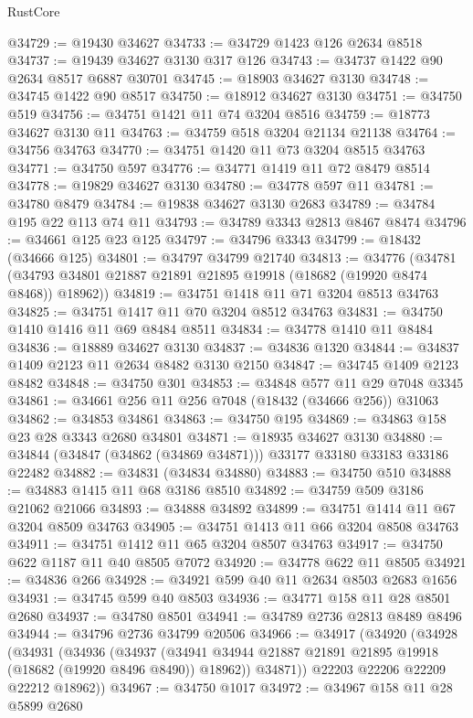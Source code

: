 \begin{lexlean}{RustCore}
\begin{coremodule}
@34729 := @19430 @34627
@34733 := @34729 @1423 @126 @2634 @8518
@34737 := @19439 @34627 @3130 @317 @126
@34743 := @34737 @1422 @90 @2634 @8517 @6887 @30701
@34745 := @18903 @34627 @3130
@34748 := @34745 @1422 @90 @8517
@34750 := @18912 @34627 @3130
@34751 := @34750 @519
@34756 := @34751 @1421 @11 @74 @3204 @8516
@34759 := @18773 @34627 @3130 @11
@34763 := @34759 @518 @3204 @21134 @21138
@34764 := @34756 @34763
@34770 := @34751 @1420 @11 @73 @3204 @8515 @34763
@34771 := @34750 @597
@34776 := @34771 @1419 @11 @72 @8479 @8514
@34778 := @19829 @34627 @3130
@34780 := @34778 @597 @11
@34781 := @34780 @8479
@34784 := @19838 @34627 @3130 @2683
@34789 := @34784 @195 @22 @113 @74 @11
@34793 := @34789 @3343 @2813 @8467 @8474
@34796 := @34661 @125 @23 @125
@34797 := @34796 @3343
@34799 := @18432 (@34666 @125)
@34801 := @34797 @34799 @21740
@34813 := @34776
    (@34781 (@34793 @34801 @21887 @21891 @21895 @19918 (@18682 (@19920 @8474 @8468)) @18962))
@34819 := @34751 @1418 @11 @71 @3204 @8513 @34763
@34825 := @34751 @1417 @11 @70 @3204 @8512 @34763
@34831 := @34750 @1410 @1416 @11 @69 @8484 @8511
@34834 := @34778 @1410 @11 @8484
@34836 := @18889 @34627 @3130
@34837 := @34836 @1320
@34844 := @34837 @1409 @2123 @11 @2634 @8482 @3130 @2150
@34847 := @34745 @1409 @2123 @8482
@34848 := @34750 @301
@34853 := @34848 @577 @11 @29 @7048 @3345
@34861 := @34661 @256 @11 @256 @7048 (@18432 (@34666 @256)) @31063
@34862 := @34853 @34861
@34863 := @34750 @195
@34869 := @34863 @158 @23 @28 @3343 @2680 @34801
@34871 := @18935 @34627 @3130
@34880 := @34844 (@34847 (@34862 (@34869 @34871))) @33177 @33180 @33183 @33186 @22482
@34882 := @34831 (@34834 @34880)
@34883 := @34750 @510
@34888 := @34883 @1415 @11 @68 @3186 @8510
@34892 := @34759 @509 @3186 @21062 @21066
@34893 := @34888 @34892
@34899 := @34751 @1414 @11 @67 @3204 @8509 @34763
@34905 := @34751 @1413 @11 @66 @3204 @8508 @34763
@34911 := @34751 @1412 @11 @65 @3204 @8507 @34763
@34917 := @34750 @622 @1187 @11 @40 @8505 @7072
@34920 := @34778 @622 @11 @8505
@34921 := @34836 @266
@34928 := @34921 @599 @40 @11 @2634 @8503 @2683 @1656
@34931 := @34745 @599 @40 @8503
@34936 := @34771 @158 @11 @28 @8501 @2680
@34937 := @34780 @8501
@34941 := @34789 @2736 @2813 @8489 @8496
@34944 := @34796 @2736 @34799 @20506
@34966 := @34917
    (@34920
      (@34928
        (@34931
          (@34936
            (@34937
              (@34941 @34944 @21887 @21891 @21895 @19918 (@18682 (@19920 @8496 @8490)) @18962))
            @34871))
        @22203
        @22206
        @22209
        @22212
        @18962))
@34967 := @34750 @1017
@34972 := @34967 @158 @11 @28 @5899 @2680

\end{coremodule}
\end{lexlean}
